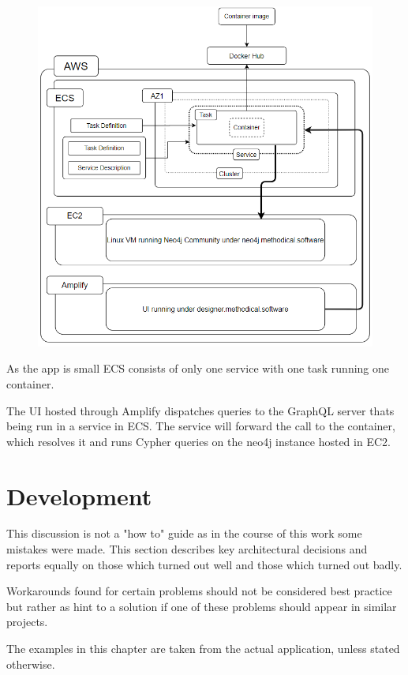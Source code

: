 \begin{figure}[h]
\centering
\includegraphics[scale=.8]{Bilder/AwsMyApp.png}
\label{ex:AwsMyApp}
\end{figure}

As the app is small ECS consists of only one service with one task running one container.

The UI hosted through Amplify dispatches queries to the GraphQL server thats being run in a service in ECS. The service will forward the call to the container, which resolves it and runs Cypher queries on the neo4j instance hosted in EC2.

\chapter{Development}
This discussion is not a "how to" guide as in the course of this work some mistakes were made. This section describes key architectural decisions and reports equally on those which turned out well and those which turned out badly.

Workarounds found for certain problems should not be considered best practice but rather as hint to a solution if one of these problems should appear in similar projects.

The examples in this chapter are taken from the actual application, unless stated otherwise.

